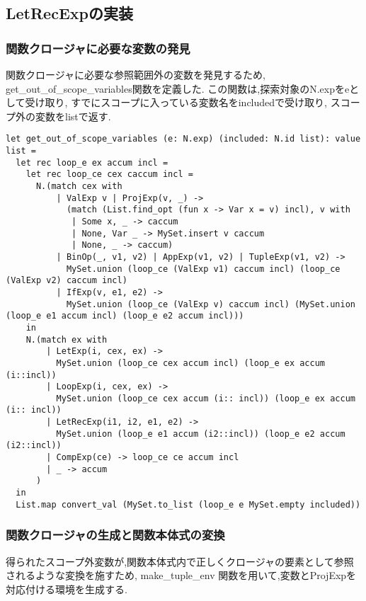 \subsection*{LetRecExpの実装}

\subsubsection*{関数クロージャに必要な変数の発見}

関数クロージャに必要な参照範囲外の変数を発見するため,
get\_out\_of\_scope\_variables関数を定義した.
この関数は,探索対象のN.expをeとして受け取り, 
すでにスコープに入っている変数名をincludedで受け取り,
スコープ外の変数をlistで返す.

\begin{lstlisting}[caption=スコープ外変数の発見]
  let get_out_of_scope_variables (e: N.exp) (included: N.id list): value list = 
  let rec loop_e ex accum incl = 
    let rec loop_ce cex caccum incl = 
      N.(match cex with
          | ValExp v | ProjExp(v, _) ->
            (match (List.find_opt (fun x -> Var x = v) incl), v with
             | Some x, _ -> caccum
             | None, Var _ -> MySet.insert v caccum
             | None, _ -> caccum)
          | BinOp(_, v1, v2) | AppExp(v1, v2) | TupleExp(v1, v2) -> 
            MySet.union (loop_ce (ValExp v1) caccum incl) (loop_ce (ValExp v2) caccum incl)
          | IfExp(v, e1, e2) ->
            MySet.union (loop_ce (ValExp v) caccum incl) (MySet.union (loop_e e1 accum incl) (loop_e e2 accum incl)))
    in 
    N.(match ex with
        | LetExp(i, cex, ex) -> 
          MySet.union (loop_ce cex accum incl) (loop_e ex accum (i::incl))
        | LoopExp(i, cex, ex) -> 
          MySet.union (loop_ce cex accum (i:: incl)) (loop_e ex accum (i:: incl))
        | LetRecExp(i1, i2, e1, e2) -> 
          MySet.union (loop_e e1 accum (i2::incl)) (loop_e e2 accum (i2::incl))
        | CompExp(ce) -> loop_ce ce accum incl
        | _ -> accum
      )
  in
  List.map convert_val (MySet.to_list (loop_e e MySet.empty included))  
\end{lstlisting}

\subsubsection*{関数クロージャの生成と関数本体式の変換}

得られたスコープ外変数が,関数本体式内で正しくクロージャの要素として参照されるような変換を施すため, make\_tuple\_env 関数を用いて,変数とProjExpを対応付ける環境を生成する.


